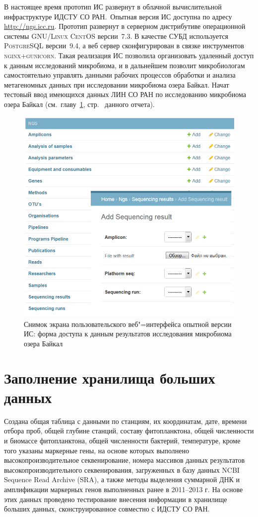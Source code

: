 \documentclass[a4paper,12pt,openany,final]{extreport}
\def\oldcaption{} \let\oldcaption=\caption
\def\caption{\stepcounter{captionsnum}\oldcaption}
\begin{document}
В настоящее время прототип ИС развернут в облачной вычислительной инфраструктуре ИДСТУ СО РАН.~Опытная версия ИС доступна по адресу \href{http://ngs.icc.ru}{{http://ngs.icc.ru}}. Прототип развернут в серверном дистрибутиве операционной системы \textsc{GNU/Linux CentOS} версии~7.3. В качестве СУБД используется \textsc{PostgreSQL} версии~9.4, а веб сервер сконфигурирован в связке инструментов \textsc{nginx+gunicorn}. Такая реализация ИС позволила организовать удаленный доступ к данным исследований микробиома, и в дальнейшем позволит микробиологам самостоятельно управлять данными рабочих процессов обработки и анализа метагеномных данных при исследовании микробиома озера Байкал. Начат тестовый ввод имеющихся данных ЛИН СО РАН по исследованию микробиома озера Байкал (см.~главу~\ref{chap:8}, стр.~\pageref{chap:8} данного отчета).

\begin{figure}\centering
\includegraphics[width=0.9\linewidth]{media/image17.png}

\caption{Снимок экрана пользовательского веб"=интерфейса опытной версии ИС: форма доступа к данным результатов исследования микробиома озера Байкал}
\end{figure}

\chapter{Заполнение хранилища больших данных}\label{chap:8}

Создана общая таблица с данными по станциям, их координатам, дате, времени отбора проб, общей глубине станций, составу фитопланктона, общей численности и биомассе фитопланктона, общей численности бактерий, температуре, кроме того указаны маркерные гены, на основе которых выполнено высокопроизводительное секвенирование, номера массивов данных результатов высокопроизводительного секвенирования, загруженных в базу данных NCBI Sequence Read Archive (SRA), а также методы выделения суммарной ДНК и амплификации маркерных генов выполненных ранее в 2011--2013 г. На основе этих данных проведено тестирование внесения информации в хранилище больших данных, сконструированное совместно с ИДСТУ СО РАН.
\end{document}
